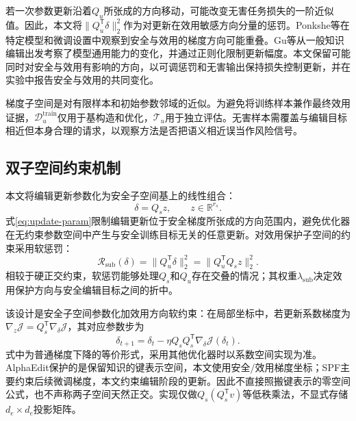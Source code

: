 若一次参数更新沿着$Q_u$所张成的方向移动，可能改变无害任务损失的一阶近似值。因此，本文将$\|Q_u^{\mathsf T}\delta\|_2^2$作为对更新在效用敏感方向分量的惩罚。Ponkshe等在特定模型和微调设置中观察到安全与效用的梯度方向可能重叠\cite{ponkshe2026safetysubspaces}。Gu等从一般知识编辑出发考察了模型通用能力的变化，并通过正则化限制更新幅度\cite{gu2024editutility}。本文保留可能同时对安全与效用有影响的方向，以可调惩罚和无害输出保持损失控制更新，并在实验中报告安全与效用的共同变化。

梯度子空间是对有限样本和初始参数邻域的近似。为避免将训练样本兼作最终效用证据，$\mathcal{D}_{u}^{\mathrm{train}}$仅用于基构造和优化，$\mathcal{T}_{u}$用于独立评估。无害样本需覆盖与编辑目标相近但本身合理的请求，以观察方法是否把语义相近误当作风险信号。

\subsection{双子空间约束机制}

本文将编辑更新参数化为安全子空间基上的线性组合：
\begin{equation}
  \delta=Q_s z,\qquad z\in\mathbb{R}^{r_s}.
  \label{eq:update-param}
\end{equation}
式\eqref{eq:update-param}限制编辑更新位于安全梯度所张成的方向范围内，避免优化器在无约束参数空间中产生与安全训练目标无关的任意更新。对效用保护子空间的约束采用软惩罚：
\begin{equation}
  \mathcal{R}_{\mathrm{sub}}(\delta)
  =\|Q_u^{\mathsf T}\delta\|_2^2
  =\|Q_u^{\mathsf T}Q_s z\|_2^2.
  \label{eq:utility-subspace-penalty}
\end{equation}
相较于硬正交约束，软惩罚能够处理$Q_s$和$Q_u$存在交叠的情况；其权重$\lambda_{\mathrm{sub}}$决定效用保护方向与安全编辑目标之间的折中。

该设计是安全子空间参数化加效用方向软约束：在局部坐标中，若更新系数梯度为$\nabla_z\mathcal J=Q_s^{\mathsf T}\nabla_\delta\mathcal J$，其对应参数步为
\begin{equation}
 \delta_{t+1}=\delta_t-\eta Q_sQ_s^{\mathsf T}\nabla_\delta\mathcal J(\delta_t).
 \label{eq:projected-edit-step}
\end{equation}
式中为普通梯度下降的等价形式，采用其他优化器时以系数空间实现为准。AlphaEdit保护的是保留知识的键表示空间，本文使用安全/效用梯度坐标；SPF主要约束后续微调梯度，本文约束编辑阶段的更新\cite{fang2024alphaedit,zhang2026spf}。因此不直接照搬键表示的零空间公式，也不声称两子空间天然正交。实现仅做$Q_s(Q_s^{\mathsf T}v)$等低秩乘法，不显式存储$d_e\times d_e$投影矩阵。

